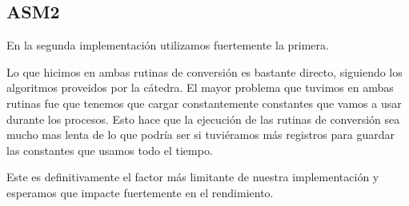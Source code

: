 \subsection{ASM2}

En la segunda implementación utilizamos fuertemente la primera.

Lo que hicimos en ambas rutinas de conversión es bastante directo, siguiendo los algoritmos proveidos por la cátedra. El mayor problema que tuvimos en ambas rutinas fue que tenemos que cargar constantemente constantes que vamos a usar durante los procesos. Esto hace que la ejecución de las rutinas de conversión sea mucho mas lenta de lo que podría ser si tuviéramos más registros para guardar las constantes que usamos todo el tiempo.

Este es definitivamente el factor más limitante de nuestra implementación y esperamos que impacte fuertemente en el rendimiento.


